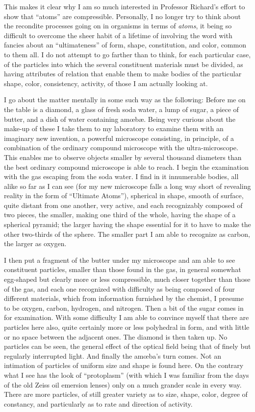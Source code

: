 \documentclass[a4paper, 11pt, oneside, polutonikogreek, english, landscape]{article}
\begin{document}
This makes it clear why I am so much interested in Professor Richard's effort to show that ``atoms'' are compressible. Personally, I no longer try to think about the recondite processes going on in organisms in terms of \emph{atoms}, it being so difficult to overcome the sheer habit of a lifetime of involving the word with fancies about an ``ultimateness'' of form, shape, constitution, and color, common to them all. I do not attempt to go farther than to think, for each particular case, of the particles into which the several constituent materials must be divided, as having attributes of relation that enable them to make bodies of the particular shape, color, consistency, activity, of those I am actually looking at.

I go about the matter mentally in some such way as the following: Before me on the table is a diamond, a glass of fresh soda water, a lump of sugar, a piece of butter, and a dish of water containing amœbæ. Being very curious about the make-up of these I take them to my laboratory to examine them with an imaginary new invention, a powerful microscope consisting, in principle, of a combination of the ordinary compound microscope with the ultra-microscope. This enables me to observe objects smaller by several thousand diameters than the best ordinary compound microscope is able to reach. I begin the examination with the gas escaping from the soda water. I find in it innumerable bodies, all alike so far as I can see (for my new microscope falls a long way short of revealing reality in the form of ``Ultimate Atoms''), spherical in shape, smooth of surface, quite distant from one another, very active, and each recognizably composed of two pieces, the smaller, making one third of the whole, having the shape of a spherical pyramid; the larger having the shape essential for it to have to make the other two-thirds of the sphere. The smaller part I am able to recognize as carbon, the larger as oxygen.

I then put a fragment of the butter under my microscope and am able to see constituent particles, smaller than those found in the gas, in general somewhat egg-shaped but clearly more or less compressible, much closer together than those of the gas, and each one recognized with difficulty as being composed of four different materials, which from information furnished by the chemist, I presume to be oxygen, carbon, hydrogen, and nitrogen. Then a bit of the sugar comes in for examination. With some difficulty I am able to convince myself that there are particles here also, quite certainly more or less polyhedral in form, and with little or no space between the adjacent ones. The diamond is then taken up. No particles can be seen, the general effect of the optical field being that of finely but regularly interrupted light. And finally the amœba's turn comes. Not an intimation of particles of uniform size and shape is found here. On the contrary what I see has the look of ``protoplasm'' (with which I was familiar from the days of the old Zeiss oil emersion lenses) only on a much grander scale in every way. There are more particles, of still greater variety as to size, shape, color, degree of constancy, and particularly as to rate and direction of activity.
\end{document}
